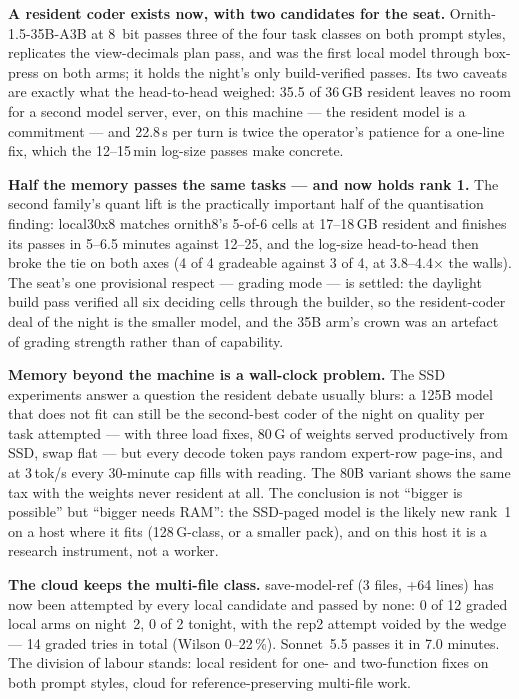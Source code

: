 \textbf{A resident coder exists now, with two candidates for the seat.} Ornith-1.5-35B-A3B at 8~bit passes three
of the four task classes on both prompt styles, replicates the view-decimals plan pass, and was the first local
model through box-press on both arms; it holds the night's only build-verified passes. Its two caveats are
exactly what the head-to-head weighed: 35.5 of 36\,GB resident leaves no room for a second model server, ever,
on this machine --- the resident model is a commitment --- and 22.8\,s per turn is twice the operator's patience
for a one-line fix, which the 12--15\,min log-size passes make concrete.

\textbf{Half the memory passes the same tasks --- and now holds rank 1.} The second family's quant lift is the
practically important half of the quantisation finding: local30x8 matches ornith8's 5-of-6 cells at 17--18\,GB
resident and finishes its passes in 5--6.5 minutes against 12--25, and the log-size head-to-head then broke the
tie on both axes (4 of 4 gradeable against 3 of 4, at 3.8--4.4$\times$ the walls). The seat's one provisional
respect --- grading mode --- is settled: the daylight build pass verified all six deciding cells through the
builder, so the resident-coder deal of the night is the smaller model, and the 35B arm's crown was an artefact
of grading strength rather than of capability.

\textbf{Memory beyond the machine is a wall-clock problem.} The SSD experiments answer a question the resident
debate usually blurs: a 125B model that does not fit can still be the second-best coder of the night on quality
per task attempted --- with three load fixes, 80\,G of weights served productively from SSD, swap flat --- but
every decode token pays random expert-row page-ins, and at 3\,tok/s every 30-minute cap fills with reading. The
80B variant shows the same tax with the weights never resident at all. The conclusion is not ``bigger is
possible'' but ``bigger needs RAM'': the SSD-paged model is the likely new rank~1 on a host where it fits
(128\,G-class, or a smaller pack), and on this host it is a research instrument, not a worker.

\textbf{The cloud keeps the multi-file class.} save-model-ref (3 files, +64 lines) has now been attempted by
every local candidate and passed by none: 0 of 12 graded local arms on night~2, 0 of 2 tonight, with the rep2
attempt voided by the wedge --- 14 graded tries in total (Wilson 0--22\,\%). Sonnet~5.5 passes it in 7.0 minutes.
The division of labour stands: local resident for one- and two-function fixes on both prompt styles, cloud for
reference-preserving multi-file work.


